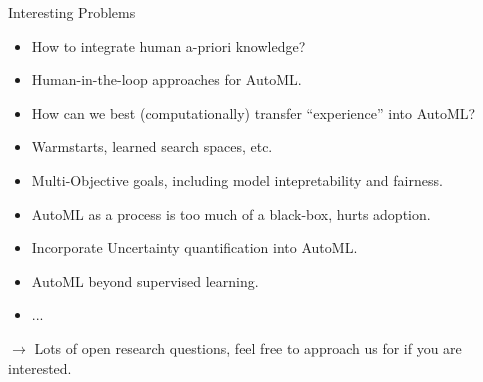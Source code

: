 	\begin{frame}{Interesting Problems}
		\begin{itemize}
			\item How to integrate human a-priori knowledge?
			\item Human-in-the-loop approaches for AutoML.
			\item How can we best (computationally) transfer “experience” into AutoML? 
			\item Warmstarts, learned search spaces, etc.
			\item Multi-Objective goals, including model intepretability and fairness.
			\item AutoML as a process is too much of a black-box, hurts adoption.
			\item Incorporate Uncertainty quantification into AutoML.
			\item AutoML beyond supervised learning.
			\item ...
		\end{itemize}
	
		$\longrightarrow$ Lots of open research questions, feel free to approach us for if you are interested. 

	\end{frame}


